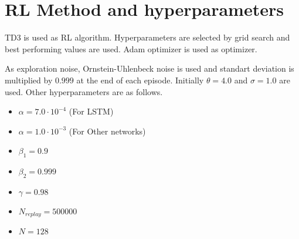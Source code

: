 \section{RL Method and hyperparameters}
\label{sec:rlmethod}

TD3 is used as RL algorithm. 
Hyperparameters are selected by grid search and best performing values are used. Adam optimizer is used as optimizer. 

As exploration noise, Ornstein-Uhlenbeck noise is used and standart deviation is multiplied  by $0.999$ at the end of each episode. 
Initially $\theta=4.0$ and $\sigma=1.0$ are used. Other hyperparameters are as follows. 
\begin{itemize}
	\item $\alpha=7.0 \cdot 10^{-4}$ (For LSTM)
	\item $\alpha=1.0 \cdot 10^{-3}$ (For Other networks)
	\item $\beta_1=0.9$
	\item $\beta_2=0.999$
	\item $\gamma=0.98$
	\item $N_{replay} = 500000$
	\item $N = 128$
\end{itemize}